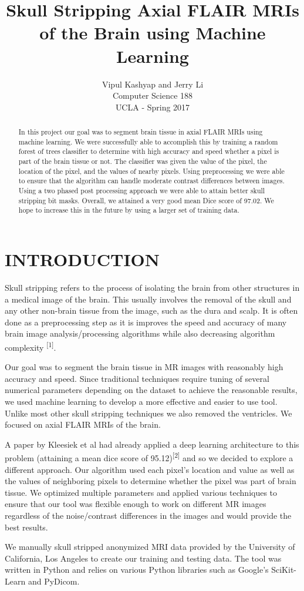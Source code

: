 \documentclass[letterpaper, 10 pt, conference]{ieeeconf}
\title{\LARGE \bf
Skull Stripping Axial FLAIR MRIs\\ of the Brain using Machine Learning
}
\author{Vipul Kashyap and Jerry Li \\ %
Computer Science 188 \\
UCLA - Spring 2017 
}
\begin{document}
\maketitle
\thispagestyle{empty}
\pagestyle{empty}

\begin{abstract}
In this project our goal was to segment brain tissue in axial FLAIR MRIs using machine learning. We were successfully able to accomplish this by training a random forest of trees classifier to determine with high accuracy and speed whether a pixel is part of the brain tissue or not. The classifier was given the value of the pixel, the location of the pixel, and the values of nearby pixels. Using preprocessing we were able to ensure that the algorithm can handle moderate contrast differences between images. Using a two phased post processing approach we were able to attain better skull stripping bit masks. Overall, we attained a very good mean Dice score of 97.02. We hope to increase this in the future by using a larger set of training data.
\end{abstract}

\section{INTRODUCTION}
Skull stripping refers to the process of isolating the brain from other structures in a medical image of the brain. This usually involves the removal of the skull and any other non-brain tissue from the image, such as the dura and scalp. It is often done as a preprocessing step as it is improves the speed and accuracy of many brain image analysis/processing algorithms while also decreasing algorithm complexity \textsuperscript{[1]}. \par
Our goal was to segment the brain tissue in MR images with reasonably high accuracy and speed. Since traditional techniques require tuning of several numerical parameters depending on the dataset to achieve the reasonable results, we used machine learning to develop a more effective and easier to use tool. Unlike most other skull stripping techniques we also removed the ventricles. We focused on axial FLAIR MRIs of the brain. \par
A paper by Kleesiek et al had already applied a deep learning architecture to this problem (attaining a mean dice score of 95.12)\textsuperscript{[2]} and so we decided to explore a different approach. Our algorithm used each pixel's location and value as well as the values of neighboring pixels to determine whether the pixel was part of brain tissue. We optimized multiple parameters and applied various techniques to ensure that our tool was flexible enough to work on different MR images regardless of the noise/contrast differences in the images and would provide the best results. \par
We manually skull stripped anonymized MRI data provided by the University of California, Los Angeles to create our training and testing data. The tool was written in Python and relies on various Python libraries such as Google's SciKit-Learn and PyDicom.
\end{document}
